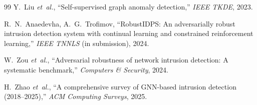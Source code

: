 \documentclass[journal,twoside]{IEEEtran}
\begin{document}
\begin{thebibliography}{99}
Y.~Liu \emph{et~al.}, ``Self-supervised graph anomaly detection,''
\emph{IEEE TKDE}, 2023.

R.~N.~Anaedevha, A.~G.~Trofimov,
``RobustIDPS: An adversarially robust intrusion detection system with
continual learning and constrained reinforcement learning,''
\emph{IEEE TNNLS} (in submission), 2024.

W.~Zou \emph{et~al.},
``Adversarial robustness of network intrusion detection: A systematic
benchmark,''
\emph{Computers \& Security}, 2024.

H.~Zhao \emph{et~al.},
``A comprehensive survey of GNN-based intrusion detection (2018--2025),''
\emph{ACM Computing Surveys}, 2025.

\end{thebibliography}
\end{document}
